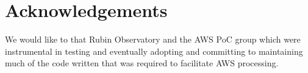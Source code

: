 \documentclass[a4paper, 10pt, conference]{ieeeconf}
\begin{document}



\section{Acknowledgements}
\noindent We would like to that Rubin Observatory and the AWS PoC group which were instrumental in testing and eventually adopting and committing to maintaining much of the code written that was required to facilitate AWS processing. 
\clearpage
\end{document}
